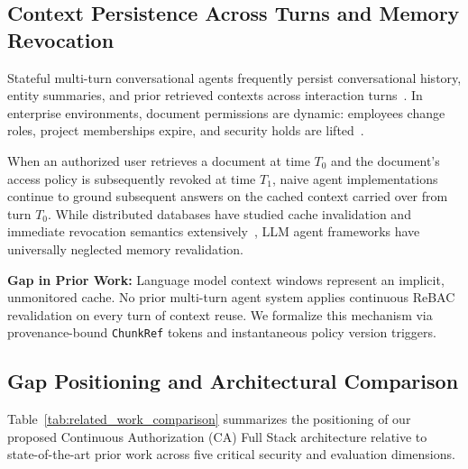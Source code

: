 \subsection{Context Persistence Across Turns and Memory Revocation}
\label{sec:rel_memory}

Stateful multi-turn conversational agents frequently persist conversational history, entity summaries, and prior retrieved contexts across interaction turns~\cite{memoryrag2025}. In enterprise environments, document permissions are dynamic: employees change roles, project memberships expire, and security holds are lifted~\cite{dbsync2024vldb, nist80053ac}.

When an authorized user retrieves a document at time $T_0$ and the document's access policy is subsequently revoked at time $T_1$, naive agent implementations continue to ground subsequent answers on the cached context carried over from turn $T_0$. While distributed databases have studied cache invalidation and immediate revocation semantics extensively~\cite{dbsync2024vldb}, LLM agent frameworks have universally neglected memory revalidation.

\noindent\textbf{Gap in Prior Work:} Language model context windows represent an implicit, unmonitored cache. No prior multi-turn agent system applies continuous ReBAC revalidation on every turn of context reuse. We formalize this mechanism via provenance-bound \texttt{ChunkRef} tokens and instantaneous policy version triggers.

\subsection{Gap Positioning and Architectural Comparison}
\label{sec:rel_comparison}

Table~\ref{tab:related_work_comparison} summarizes the positioning of our proposed Continuous Authorization (CA) Full Stack architecture relative to state-of-the-art prior work across five critical security and evaluation dimensions.

